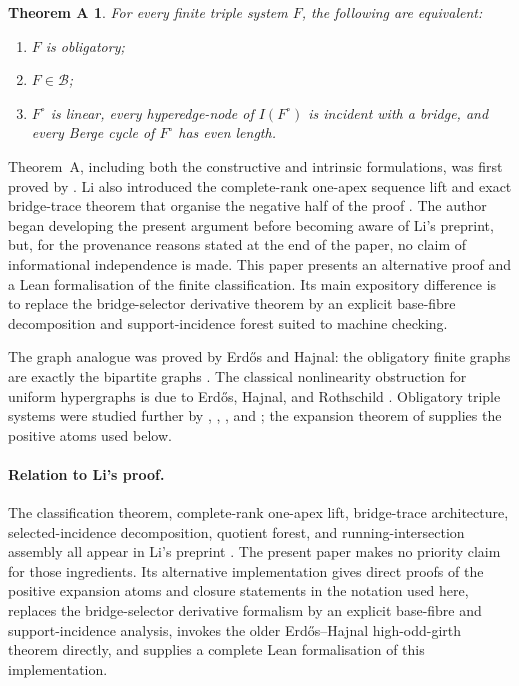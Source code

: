 \documentclass[a4paper,11pt,reqno]{amsart}
\theoremstyle{plain}
\newtheorem*{theoremA}{Theorem A}
\theoremstyle{definition}
\theoremstyle{remark}
\begin{document}
\begin{theoremA}\label{theorem-a-exact-characterisation}
For every finite triple system $F$, the following are equivalent:
\begin{enumerate}
\item $F$ is obligatory;
\item $F\in\mathcal B$;
\item $F^\circ$ is linear, every hyperedge-node of $I(F^\circ)$ is incident
with a bridge, and every Berge cycle of $F^\circ$ has even length.
\end{enumerate}
\end{theoremA}

Theorem~A, including both the constructive and intrinsic formulations, was
first proved by \citet[Theorem~1.1]{li2026}.  Li also introduced the
complete-rank one-apex sequence lift and exact bridge-trace theorem that
organise the negative half of the proof
\citep[Sections~3--4 and Theorem~4.6]{li2026}.  The author began developing
the present argument before becoming aware of Li's preprint, but, for the
provenance reasons stated at the end of the paper, no claim of informational
independence is made.  This paper presents an alternative proof and a Lean
formalisation of the finite classification.  Its main expository difference
is to replace the bridge-selector derivative theorem by an explicit
base-fibre decomposition and support-incidence forest suited to machine
checking.

The graph analogue was proved by Erdős and Hajnal: the obligatory finite
graphs are exactly the bipartite graphs
\citep[Corollary~5.6 and Theorem~7.4]{erdoshajnal1966}.  The classical
nonlinearity obstruction for uniform hypergraphs is due to Erdős, Hajnal,
and Rothschild \citep[Theorem~2, p.~532]{ehr1973}.  Obligatory triple
systems were studied further by \citet{egh1975}, \citet{komjath2001},
\citet{hajnalkomjath2008}, and \citet{komjath2008}; the expansion theorem of
\citet[Theorem~1.2]{reiher2024} supplies the positive atoms used below.

\paragraph{Relation to Li's proof.}
The classification theorem, complete-rank one-apex lift, bridge-trace
architecture, selected-incidence decomposition, quotient forest, and
running-intersection assembly all appear in Li's preprint
\citep[Sections~3--5]{li2026}.  The present paper makes no priority claim for
those ingredients.  Its alternative implementation gives direct proofs of
the positive expansion atoms and closure statements in the notation used
here, replaces the bridge-selector derivative formalism by an explicit
base-fibre and support-incidence analysis, invokes the older Erdős--Hajnal
high-odd-girth theorem directly, and supplies a complete Lean formalisation of
this implementation.
\end{document}
